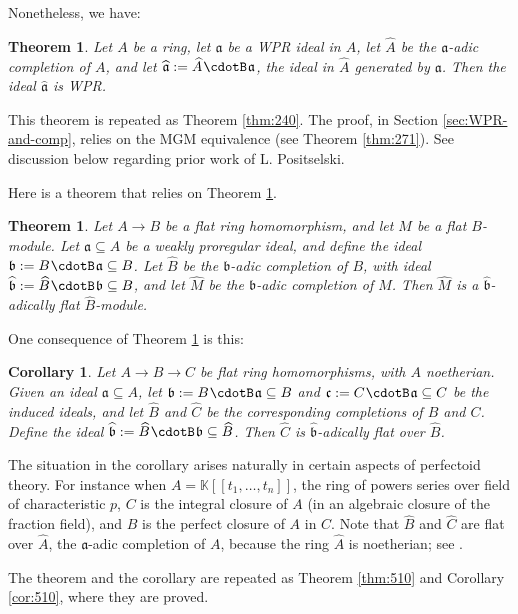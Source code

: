 \documentclass[10pt]{amsart}
\newtheorem{thm}[equation]{Theorem}
\newtheorem{cor}[equation]{Corollary}
\theoremstyle{definition}
\numberwithin{equation}{section}
\newcommand{\sub}{\subseteq}
\newcommand{\cd}{\mspace{1.3mu}{\cdotB}\mspace{1.3mu}}
\newcommand{\mfrak}[1]{\mathfrak{#1}}
\renewcommand{\a}{\mfrak{a}}
\renewcommand{\b}{\mfrak{b}}
\renewcommand{\c}{\mfrak{c}}
\newcommand{\K}{\mathbb{K}}
\newcommand{\what}[1]{\widehat{#1}}
\newcommand{\wh}[1]{\widehat{#1}}
\begin{document}
Nonetheless, we have:

\begin{thm} \label{thm:230}
Let $A$ be a ring, let $\a$ be a WPR ideal in $A$,
let $\what{A}$ be the $\a$-adic completion of $A$, and let
$\what{\a} := \what{A} \cd \a$, the ideal in $\what{A}$ generated by $\a$. Then
the ideal $\what{\a}$ is WPR.
\end{thm}

This theorem is repeated as Theorem \ref{thm:240}. The proof, in Section
\ref{sec:WPR-and-comp}, relies on the MGM equivalence (see Theorem
\ref{thm:271}). See discussion below regarding prior work of L. Positselski.

Here is a theorem that relies on Theorem \ref{thm:230}.

\begin{thm} \label{thm:516}
Let $A \to B$ be a flat ring homomorphism, and let $M$ be a flat $B$-module.
Let $\a \sub A$ be a weakly proregular ideal, and define the ideal
$\b := B \cd \a \sub B$. Let $\wh{B}$ be the $\b$-adic completion of $B$, with
ideal $\wh{\b} := \wh{B} \cd \b \sub B$, and let
$\wh{M}$ be the $\b$-adic completion of $M$.
Then $\wh{M}$ is a $\wh{\b}$-adically flat $\wh{B}$-module.
\end{thm}

One consequence of Theorem \ref{thm:516} is this:

\begin{cor} \label{cor:525}
Let $A \to B \to C$ be flat ring homomorphisms, with $A$ noetherian.
Given an ideal $\a \sub A$, let $\b := B \cd \a \sub B$ and
$\c := C \cd \a \sub C$ be the induced ideals, and let
$\wh{B}$ and $\wh{C}$ be the corresponding completions of $B$ and $C$.
Define the ideal $\wh{\b} := \wh{B} \cd \b \sub \wh{B}$.
Then $\wh{C}$ is $\wh{\b}$-adically flat over $\wh{B}$.
\end{cor}

The situation in the corollary arises naturally in certain aspects of perfectoid
theory. For instance when $A = \K[[t_1, \ldots, t_n]]$, the ring of powers
series over field of characteristic $p$, $C$ is the integral closure of $A$
(in an algebraic closure of the fraction field), and $B$ is the perfect closure
of $A$ in $C$.
Note that $\wh{B}$ and $\wh{C}$ are flat over $\wh{A}$, the $\a$-adic
completion of $A$, because the ring $\wh{A}$ is noetherian; see
\cite[Theorem 1.5]{Ye4}.

The theorem and the corollary are repeated as Theorem \ref{thm:510} and
Corollary \ref{cor:510}, where they are proved.
\end{document}
